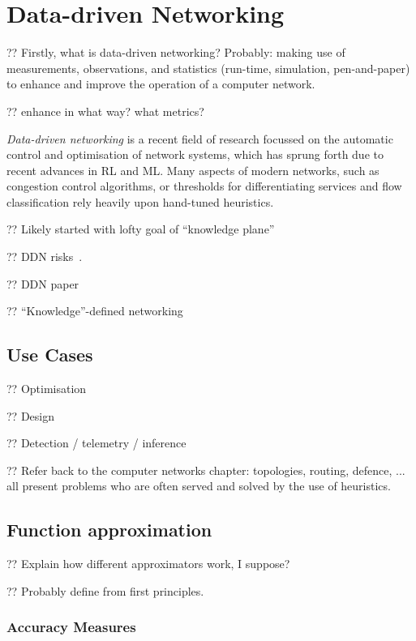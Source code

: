 \chapter{Data-driven Networking}

?? Firstly, what is data-driven networking? Probably: making use of measurements, observations, and statistics (run-time, simulation, pen-and-paper) to enhance and improve the operation of a computer network.

?? enhance in what way? what metrics?

\emph{Data-driven networking} is a recent field of research focussed on the automatic control and optimisation of network systems, which has sprung forth due to recent advances in RL and ML.
Many aspects of modern networks, such as congestion control algorithms, or thresholds for differentiating services and flow classification rely heavily upon hand-tuned heuristics.

?? Likely started with lofty goal of ``knowledge plane''~\cite{DBLP:conf/sigcomm/ClarkPRW03}

?? DDN risks~\cite{DBLP:conf/hotnets/BartulovicJBSS17}.

?? DDN paper~\cite{DBLP:conf/comsnets/JiangSSZ17}

?? ``Knowledge''-defined networking~\cite{DBLP:journals/corr/MestresRCBASMMB16}

\section{Use Cases}

?? Optimisation

?? Design

?? Detection / telemetry / inference

?? Refer back to the computer networks chapter: topologies, routing, defence, ... all present problems who are often served and solved by the use of heuristics.

\section{Function approximation}

?? Explain how different approximators work, I suppose?

?? Probably  define from first principles.

\subsection{Accuracy Measures}

